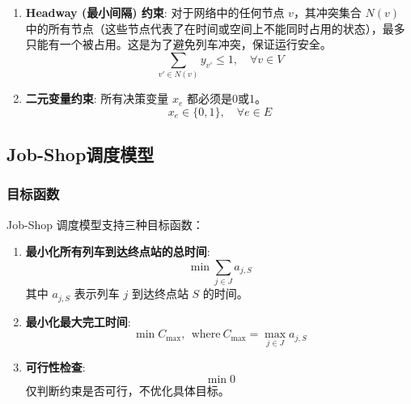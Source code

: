 \documentclass{article}
\begin{document}
\begin{enumerate}
    \item \textbf{Headway (最小间隔) 约束}:
        对于网络中的任何节点 $v$，其冲突集合 $N(v)$
        中的所有节点（这些节点代表了在时间或空间上不能同时占用的状态），最多只能有一个被占用。这是为了避免列车冲突，保证运行安全。
        \begin{equation}
            \sum_{v' \in N(v)} y_{v'} \le 1, \quad \forall v \in
            V\label{eq:con_headway}
        \end{equation}

    \item \textbf{二元变量约束}:
        所有决策变量 $x_e$ 都必须是0或1。
        \begin{equation}
            x_e \in \{0,1\}, \quad \forall e \in E\label{eq:con_binary}
        \end{equation}
\end{enumerate}

\subsection{Job-Shop调度模型}\label{subsec:job-shop}

\subsubsection{目标函数}
Job-Shop 调度模型支持三种目标函数：

\begin{enumerate}
    \item \textbf{最小化所有列车到达终点站的总时间}:
        \begin{equation}
            \min \sum_{j \in J} a_{j, S}\label{eq:min_sum_arrival}
        \end{equation}
        其中 $a_{j, S}$ 表示列车 $j$ 到达终点站 $S$ 的时间。

    \item \textbf{最小化最大完工时间}:
        \begin{equation}
            \min C_{\max} , \ \ \text{where} \ C_{\max} = \max_{j \in J}
            a_{j, S}\label{eq:min}
        \end{equation}

    \item \textbf{可行性检查}:
        \begin{equation}
            \min 0\label{eq:feasibility}
        \end{equation}
        仅判断约束是否可行，不优化具体目标。
\end{enumerate}
\end{document}
